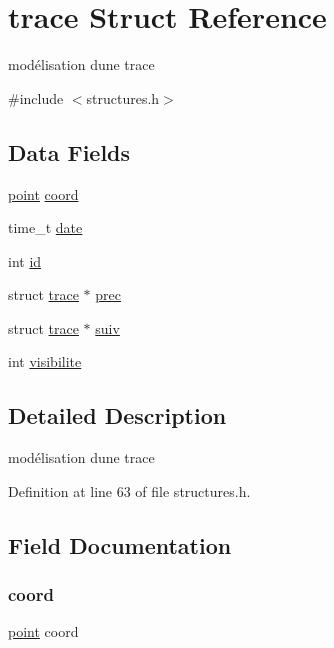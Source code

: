 \hypertarget{structtrace}{}\section{trace Struct Reference}
\label{structtrace}


modélisation d\textquotesingle{}une trace  




{\ttfamily \#include $<$structures.\+h$>$}

\subsection*{Data Fields}
\begin{DoxyCompactItemize}
\item 
\hyperlink{structpoint}{point} \hyperlink{structtrace_a16be187ac405f3bb61930a342b444253}{coord}
\item 
time\+\_\+t \hyperlink{structtrace_afd1d5f3476eea5753c7c59bfa90777ba}{date}
\item 
int \hyperlink{structtrace_a7441ef0865bcb3db9b8064dd7375c1ea}{id}
\item 
struct \hyperlink{structtrace}{trace} $\ast$ \hyperlink{structtrace_a1967dba5ed4900e2f554b2442863e69e}{prec}
\item 
struct \hyperlink{structtrace}{trace} $\ast$ \hyperlink{structtrace_ab7909a2cccd6f40ca9499c850c9c948c}{suiv}
\item 
int \hyperlink{structtrace_aa34b47a3ed3a7dfed8a672132bcc3f2a}{visibilite}
\end{DoxyCompactItemize}


\subsection{Detailed Description}
modélisation d\textquotesingle{}une trace 

Definition at line 63 of file structures.\+h.



\subsection{Field Documentation}
\hypertarget{structtrace_a16be187ac405f3bb61930a342b444253}{}\label{structtrace_a16be187ac405f3bb61930a342b444253} 
\subsubsection{\texorpdfstring{coord}{coord}}
{\footnotesize\ttfamily \hyperlink{structpoint}{point} coord}

